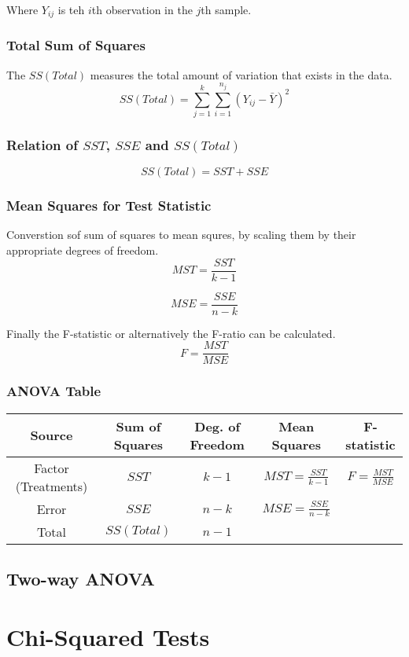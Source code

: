 \documentclass{article}
\begin{document}
Where $Y_{ij}$ is teh $i$th observation in the $j$th sample.

\subsubsection{Total Sum of Squares}
The $SS(Total)$ measures the total amount of variation that exists in the data.
$$
SS(Total) = \sum_{j=1}^k \sum_{i=1}^{n_j} (Y_{ij} - \bar{Y})^2
$$


\subsubsection{Relation of $SST$, $SSE$ and $SS(Total)$}

$$
SS(Total) = SST + SSE
$$

\subsubsection{Mean Squares for Test Statistic}
Converstion sof sum of squares to mean squres, by scaling them by their appropriate degrees of freedom.
$$
MST = \frac{SST}{k -1}
$$

$$
MSE = \frac{SSE}{n - k}
$$

Finally the F-statistic or alternatively the F-ratio can be calculated.
$$
F = \frac{MST}{MSE}
$$

\subsubsection{ANOVA Table}

\begin{center}
\begin{tabular}{ c c c c c }
 \hline
 Source & Sum of Squares & Deg. of Freedom & Mean Squares & F-statistic\\ 
 \hline
 Factor (Treatments) & $SST$ & $k - 1$ & $MST = \frac{SST}{k-1}$ & $F = \frac{MST}{MSE}$\\  
 Error & $SSE$ & $n - k$ & $MSE = \frac{SSE}{n - k}$    \\
  \hline
 Total & $SS(Total)$ & $n -1$
\end{tabular}
\end{center}

\subsection{Two-way ANOVA}




\section{Chi-Squared Tests}
\end{document}
